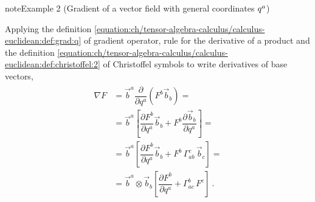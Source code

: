 \documentclass[letterpaper,10pt,english]{jupyterBook}
\begin{document}
\begin{sphinxadmonition}{note}{Example 2 (Gradient of a vector field \sphinxhyphen{} with general coordinates \protect\(q^{a}\protect\))}



\sphinxAtStartPar
Applying the definition \eqref{equation:ch/tensor-algebra-calculus/calculus-euclidean:def:grad:q} of gradient operator, rule for the derivative of a product and the definition \eqref{equation:ch/tensor-algebra-calculus/calculus-euclidean:def:christoffel:2} of Christoffel symbols to write derivatives of base vectors,
\begin{equation*}
\begin{split}\begin{aligned}
  \nabla F 
  & = \vec{b}^a \dfrac{\partial}{\partial q^a} \left( F^b \vec{b}_b \right) = \\
  & = \vec{b}^a \left[ \dfrac{\partial F^b}{\partial q^a} \vec{b}_b + F^b \dfrac{\partial \vec{b}_b}{\partial q^a} \right] = \\
  & = \vec{b}^a \left[ \dfrac{\partial F^b}{\partial q^a} \vec{b}_b + F^b \, \Gamma_{ab}^c \, \vec{b}_c \right] = \\
  & = \vec{b}^a \otimes \vec{b}_b \left[ \dfrac{\partial F^b}{\partial q^a} + \Gamma_{ac}^b \, F^c \right] \ .
\end{aligned}\end{split}
\end{equation*}\end{sphinxadmonition}
\label{ch/tensor-algebra-calculus/calculus-euclidean:example-6}
\end{document}
